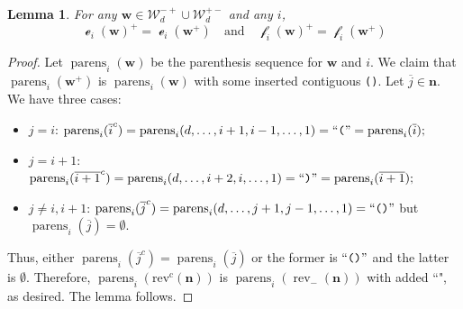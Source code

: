 \documentclass[12pt]{amsart}
\newcommand{\bs}{\boldsymbol}
\DeclareMathOperator{\worde}{{\mathcal e}}
\DeclareMathOperator{\wordf}{{\mathcal f}}
\newtheorem{lemma}[theorem]{Lemma}
\theoremstyle{definition}
\theoremstyle{remark}
\newcommand{\barindex}[1]{\overline{#1}}
\begin{document}
\begin{lemma} \label{lem-dual-words-crystals}
For any ${\bs w}\in {\mathcal W}_d^{-+}\cup {\mathcal W}_d^{+-}$ and any $i$,
\[\worde_i({\bs w})^+ = \worde_i({\bs w}^+) 
\quad \text{and} \quad
\wordf_i({\bs w})^+ = \wordf_i({\bs w}^+) 
\]
\end{lemma}
\begin{proof}
Let $\operatorname{parens}_i({\bs w})$ be the parenthesis sequence for ${\bs w}$ and $i$.
We claim that $\operatorname{parens}_i({\bs w}^+)$ is $\operatorname{parens}_i({\bs w})$ with some inserted contiguous {\tt ()}. Let $\barindex{j}\in{\bs n}$. We have three cases:
\begin{itemize}
\item $j = i$:
$
\operatorname{parens}_i(\barindex{i}^c) = \operatorname{parens}_i(d,\ldots,i+1,i-1,\ldots,1) = ``\text{{\tt (}}" = \operatorname{parens}_i(\barindex{i});
$
\item $j = i+1$:
$
\operatorname{parens}_i(\barindex{i+1}^c) = \operatorname{parens}_i(d,\ldots,i+2,i,\ldots,1) = ``\text{{\tt )}}" = \operatorname{parens}_i(\barindex{i+1});
$
\item $j \ne i, i+1$:
$
\operatorname{parens}_i(\barindex{j}^c) = \operatorname{parens}_i(d,\ldots,j+1,j-1,\ldots,1) = ``\text{\tt ()}"
$ but $\operatorname{parens}_i(\barindex{j}) = \emptyset$.
\end{itemize}
Thus, either $\operatorname{parens}_i(\barindex{j}^c) = \operatorname{parens}_i(\barindex{j})$ or the former is 
$ ``\text{\tt ()}"$ and the latter is $\emptyset$. Therefore, $\operatorname{parens}_i(\operatorname{rev^c}({\bs n}))$ is $\operatorname{parens}_i(\operatorname{rev}_{-}({\bs n}))$ 
with added ``\text{\tt ()}", as desired. The lemma follows.
%
\end{proof}
\end{document}
